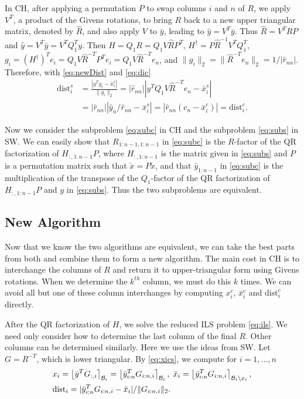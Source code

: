 \documentclass[12pt,Bold,letterpaper]{mcgilletdclass}
\newcommand{\dist}{\mathrm{dist}}
\begin{document}
In CH, after applying a permutation $P$ to swap columns $i$ and $n$ of $R$,  
we apply $V^T$, a product of the Givens rotations, to bring $R$ back to a new upper triangular
matrix, denoted by $\hat{R}$, and also apply $V$ to $\bar{y}$, 
leading to  $\hat{y} = V^T\bar{y}$. 
Thus  $\hat{R}=V^T RP$ and $\hat{y} = V^T\bar{y}=V^TQ_1^Ty$. 
Then $H=Q_1R= Q_1V\hat{R}P^T$, $H^\dag= P\hat{R}^{-1}V^TQ_1^T$, 
$g_i=(H^\dag)^Te_i=Q_1V\hat{R}^{-T}P^Te_i=Q_1V\hat{R}^{-T}e_n$,
and $\|g_i\|_2=\|\hat{R}^{-T}e_n\|_2=1/|\hat{r}_{nn}|$.
Therefore, with \eqref{eq:newDist} and \eqref{eq:dic}
\begin{align}
\dist_i^s
&=\frac{ | y^Tg_i - \bar{x}_i^s   |}{  \| g_i   \|_2} 
=|\hat{r}_{nn}||y^TQ_1V\hat{R}^{-T}e_n- \bar{x}_i^s  |  \label{eq:disc} \\
& = |\hat{r}_{nn}|| \hat{y}_n/\hat{r}_{nn} - \bar{x}_i^s | 
 = |\hat{r}_{nn}(c_n-\bar{x}_i^c)| =\dist_i^c.  \nonumber
\end{align}

Now we consider  the subproblem \eqref{eq:subc} in CH and the subproblem \eqref{eq:subs} in SW.
We can easily show that $R_{1:n-1,1:n-1}$ in  \eqref{eq:subc} is the $R$-factor of the QR factorization
of $H_{:,1:n-1}P$, where $H_{:,1:n-1}$ is the matrix given in \eqref{eq:subs}
and $P$ is a permutation matrix such that $\check{x}=P\tilde{x}$,
and that $\bar{y}_{1:n-1}$ in  \eqref{eq:subc} is the multiplication of the transpose of 
the $Q_1$-factor of the QR factorization of $H_{:,1:n-1}P$ and $y$ in \eqref{eq:subs}.
Thus the two subproblems are equivalent. 

\subsection{New Algorithm}
Now that we know the two algorithms are equivalent, we can take the best
parts from both and combine them to form a new algorithm. 
The main cost in CH is to interchange the columns of $R$ and return it to
upper-triangular form using Givens rotations. 
When we determine the $k^{th}$ column,  we must do this $k$ times. 
We can avoid all but one of these column interchanges by computing $x_i^c$, 
$\bar{x}_i^c$ and $\dist_i^c$ directly. 

After the QR factorization of $H$, we  solve the reduced ILS problem \eqref{eq:ils}.
We need only consider how to determine the last column of the final $R$.
Other columns can be determined similarly. 
Here we use the ideas from SW.
Let $G=R^{-T}$, which is lower triangular.
By \eqref{eq:xics}, we compute for $i=1,\ldots, n$
\begin{align*}
& x_i = \left \lfloor \bar{y}^TG_{:,i} \right \rceil_{{\cal B}_i} 
=\left \lfloor \bar{y}_{i:n}^T G_{i:n,i} \right \rceil_{{\cal B}_i}, \;
\bar{x}_i=\left \lfloor \bar{y}_{i:n}^T G_{i:n,i} \right \rceil_{{\cal B}_i\backslash x_i}, \\
& \dist_i = |\bar{y}_{i:n}^T G_{i:n,i}-\bar{x}_i|/\|G_{i:n,i}\|_2.
\end{align*}
\end{document}

